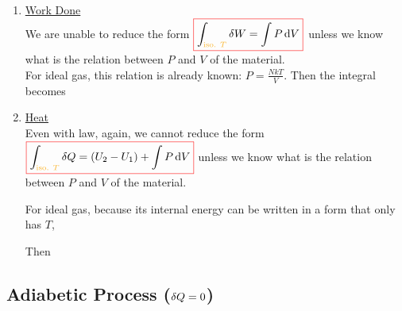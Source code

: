 \documentclass[class=article, crop=false, 12pt]{standalone}
\begin{document}
\begin{enumerate}
    \item \ul{Work Done}\\
    We are unable to reduce the form $\cbox[red]{\displaystyle \int_\yellow{\text{iso. }T}\var{W} = \int P\dd{V}}$ 
    unless we know what is the relation between $P$ and $V$ of the material.\\

    For ideal gas, this relation is already known: $\displaystyle P = \frac{NkT}{V}$.
    Then the integral becomes

    \item \ul{Heat}\\
    Even with  law, again, we cannot reduce the form $\cbox[red]{\displaystyle \int_\yellow{\text{iso. }T}\var{Q} = (U_2 - U_1) + \int P\dd{V}}$
    unless we know what is the relation between $P$ and $V$ of the material.

    For ideal gas, because its internal energy can be written in a form that only has $T$,

    Then 

\end{enumerate}

\subsection{Adiabetic Process ($\var{Q}=0$)}

\end{document}
